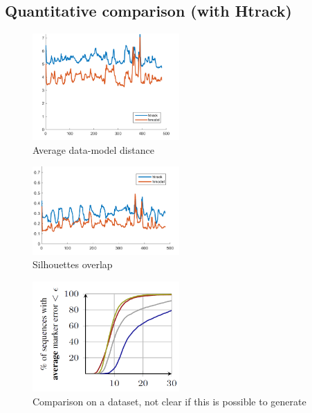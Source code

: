 \documentclass[tog]{acmsiggraph}
\begin{document}
\subsection{Quantitative comparison (with Htrack)}
\begin{figure}[h!] 
	\centering
	\includegraphics[width=0.5\textwidth]{fig/draft/draft_pull_error}
	\caption{Average data-model distance}
	\label{fig:modeling}
\end{figure}
\begin{figure}[h!] 
	\centering
	\includegraphics[width=0.5\textwidth]{fig/draft/draft_push_error}
	\caption{Silhouettes overlap}
	\label{fig:modeling}
\end{figure}
\begin{figure}[h!] 
	\centering
	\includegraphics[width=0.5\textwidth]{fig/draft/draft_hmodel_htrack_comparison}
	\caption{Comparison on a dataset, not clear if this is possible to generate}
	\label{fig:modeling}
\end{figure}
\end{document}
